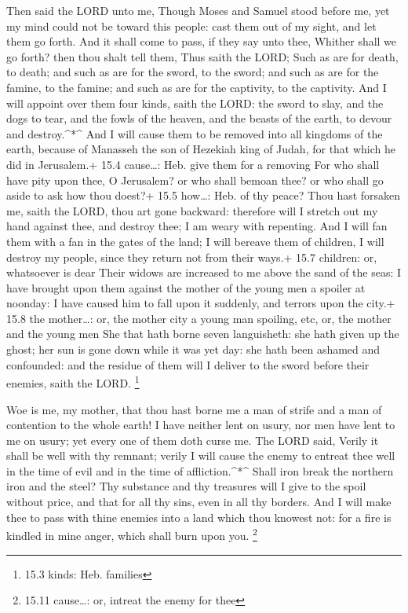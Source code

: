  Then said the LORD unto me, Though Moses and Samuel stood
before me, yet my mind could not be toward this people: cast them out of
my sight, and let them go forth.  And it shall come to pass,
if they say unto thee, Whither shall we go forth? then thou shalt tell
them, Thus saith the LORD; Such as are for death, to death; and such as
are for the sword, to the sword; and such as are for the famine, to the
famine; and such as are for the captivity, to the captivity.
 And I will appoint over them four kinds, saith the LORD:
the sword to slay, and the dogs to tear, and the fowls of the heaven,
and the beasts of the earth, to devour and destroy.\^{}*\^{}
 And I will cause them to be removed into all kingdoms of
the earth, because of Manasseh the son of Hezekiah king of Judah, for
that which he did in Jerusalem.+ 15.4 cause\ldots: Heb. give them for a
removing  For who shall have pity upon thee, O Jerusalem? or
who shall bemoan thee? or who shall go aside to ask how thou doest?+
15.5 how\ldots: Heb. of thy peace?  Thou hast forsaken me,
saith the LORD, thou art gone backward: therefore will I stretch out my
hand against thee, and destroy thee; I am weary with repenting.
 And I will fan them with a fan in the gates of the land; I
will bereave them of children, I will destroy my people, since they
return not from their ways.+ 15.7 children: or, whatsoever is dear
 Their widows are increased to me above the sand of the
seas: I have brought upon them against the mother of the young men a
spoiler at noonday: I have caused him to fall upon it suddenly, and
terrors upon the city.+ 15.8 the mother\ldots: or, the mother city a
young man spoiling, etc, or, the mother and the young men 
She that hath borne seven languisheth: she hath given up the ghost; her
sun is gone down while it was yet day: she hath been ashamed and
confounded: and the residue of them will I deliver to the sword before
their enemies, saith the LORD. \footnote{15.3 kinds: Heb. families}

 Woe is me, my mother, that thou hast borne me a man of
strife and a man of contention to the whole earth! I have neither lent
on usury, nor men have lent to me on usury; yet every one of them doth
curse me.  The LORD said, Verily it shall be well with thy
remnant; verily I will cause the enemy to entreat thee well in the time
of evil and in the time of affliction.\^{}*\^{}  Shall iron
break the northern iron and the steel?  Thy substance and
thy treasures will I give to the spoil without price, and that for all
thy sins, even in all thy borders.  And I will make thee to
pass with thine enemies into a land which thou knowest not: for a fire
is kindled in mine anger, which shall burn upon you. \footnote{15.11
  cause\ldots: or, intreat the enemy for thee}


